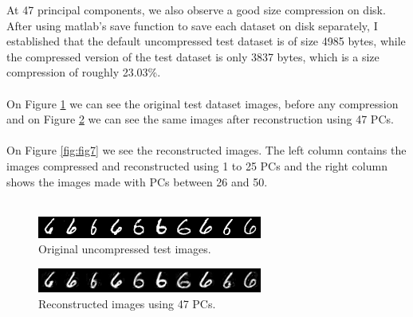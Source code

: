 \documentclass[a4paper,11pt,twocolumn]{article}
\begin{document}
At 47 principal components, we also observe a good size compression on disk. After using matlab's save function to save each dataset on disk separately, I established that the default uncompressed test dataset is of size 4985 bytes, while the compressed version of the test dataset is only 3837 bytes, which is a size compression of roughly 23.03\%.
\\\\On Figure \ref{fig:fig5} we can see the original test dataset images, before any compression and on Figure \ref{fig:fig6} we can see the same images after reconstruction using 47 PCs.
\\\\On Figure \ref{fig:fig7} we see the reconstructed images. The left column contains the images compressed and reconstructed using 1 to 25 PCs and the right column shows the images made with PCs between 26 and 50.\\\\ 

\begin{figure}[!h]
  \centering
  \includegraphics[width=\linewidth]{img/original.png}
  \caption{Original uncompressed test images.}
  \label{fig:fig5}
\end{figure}

\begin{figure}[!h]
  \centering
  \includegraphics[width=\linewidth]{img/47pcs.png}
  \caption{Reconstructed images using 47 PCs.}
  \label{fig:fig6}
\end{figure}
\end{document}
